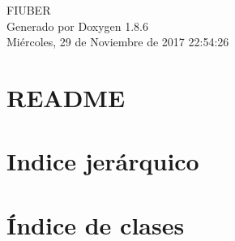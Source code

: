 \documentclass[twoside]{book}
\newcommand{\clearemptydoublepage}{%
  \newpage{\pagestyle{empty}\cleardoublepage}%
}
\begin{document}
\hypersetup{pageanchor=false}
\begin{titlepage}
\vspace*{7cm}
\begin{center}%
{\Large F\-I\-U\-B\-E\-R }\\
\vspace*{1cm}
{\large Generado por Doxygen 1.8.6}\\
\vspace*{0.5cm}
{\small Miércoles, 29 de Noviembre de 2017 22:54:26}\\
\end{center}
\end{titlepage}
\clearemptydoublepage
\tableofcontents
\clearemptydoublepage
{}
\hypersetup{pageanchor=true}

\chapter{R\-E\-A\-D\-M\-E}
\label{md__r_e_a_d_m_e}
\hypertarget{md__r_e_a_d_m_e}{}

\chapter{Indice jerárquico}

\chapter{Índice de clases}

\end{document}
